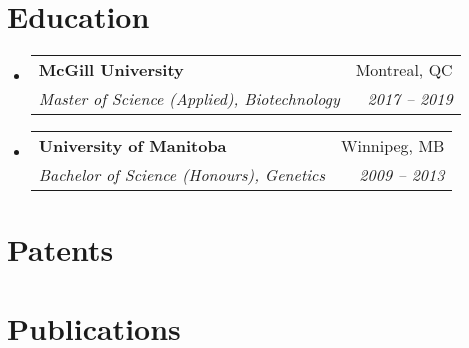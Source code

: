\documentclass[letterpaper,11pt]{article}
\makeatletter
\newcommand{\resumeItem}[1]{
  \item\small{
    {#1 \vspace{-2pt}}
  }
}
\newcommand{\resumeSubheading}[4]{
  \vspace{-2pt}\item
    \begin{tabular*}{0.97\textwidth}[t]{l@{\extracolsep{\fill}}r}
      \textbf{#1} & #2 \\
      \textit{\small#3} & \textit{\small #4} \\
    \end{tabular*}\vspace{-8pt}
}
\newcommand{\resumeAwardItem}[3][\vspace{-7pt}]{
	\item
    \begin{tabular*}{0.94\textwidth}[t]{l@{\extracolsep{\fill}}r}
     {\small#2} & \small#3      
    \end{tabular*}
	{\textit{\small#1}}\vspace{-7pt}
}
\newcommand{\resumeSubHeadingListStart}{\begin{itemize}[leftmargin=0.15in, label={}]}
\newcommand{\resumeSubHeadingListEnd}{\end{itemize}}
\newcommand{\resumeItemListStart}{\begin{itemize}}
\newcommand{\resumeItemListEnd}{\end{itemize}\vspace{-5pt}}
\makeatother
\begin{document}
\section{Education}
  \resumeSubHeadingListStart
    \resumeSubheading
      {McGill University}{Montreal, QC}
      {Master of Science (Applied), Biotechnology}{2017 -- 2019}

    \resumeSubheading
      {University of Manitoba}{Winnipeg, MB}
      {Bachelor of Science (Honours), Genetics}{2009 -- 2013}
  \resumeSubHeadingListEnd




%
%



\section{Patents}
\nocite{SONG_CBD,LIAO_OAC}
  \printbibliography[heading=none]

\section{Publications}
\begin{refsection}
    \nocite{LY2015114}
    \printbibliography[heading=none]
\end{refsection}
%



\end{document}
